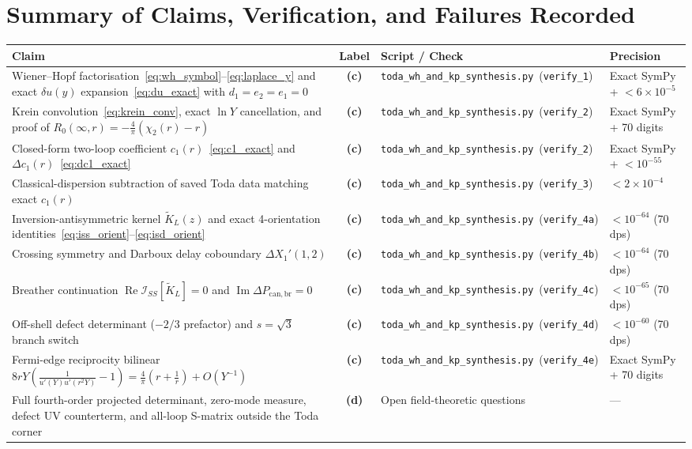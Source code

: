\documentclass[11pt,a4paper]{article}
\newcommand{\Lc}{\textsf{\textbf{(c)}}}
\newcommand{\Ld}{\textsf{\textbf{(d)}}}
\newcommand{\scrshort}{\texttt{toda\_\allowbreak wh\_\allowbreak and\_\allowbreak kp\_\allowbreak synthesis.py}}
\theoremstyle{remark}
\begin{document}
\section{Summary of Claims, Verification, and Failures Recorded}

\begin{longtable}{@{}L{6.5cm}cL{4.2cm}L{2.8cm}@{}}
\toprule
Claim & Label & Script / Check & Precision \\
\midrule
\endhead
Wiener--Hopf factorisation~\eqref{eq:wh_symbol}--\eqref{eq:laplace_y} and exact $\delta u(y)$ expansion~\eqref{eq:du_exact} with $d_1=e_2=e_1=0$ & \Lc & \scrshort\ (\texttt{verify\_1}) & Exact SymPy + $<6\times 10^{-5}$ \\
Krein convolution~\eqref{eq:krein_conv}, exact $\ln Y$ cancellation, and proof of $R_0(\infty,r) = -\frac{4}{\pi}(\chi_2(r)-r)$ & \Lc & \scrshort\ (\texttt{verify\_2}) & Exact SymPy + 70 digits \\
Closed-form two-loop coefficient $c_1(r)$~\eqref{eq:c1_exact} and $\Delta c_1(r)$~\eqref{eq:dc1_exact} & \Lc & \scrshort\ (\texttt{verify\_2}) & Exact SymPy + $<10^{-55}$ \\
Classical-dispersion subtraction of saved Toda data matching exact $c_1(r)$ & \Lc & \scrshort\ (\texttt{verify\_3}) & $<2\times 10^{-4}$ \\
Inversion-antisymmetric kernel $\widetilde{K}_L(z)$ and exact 4-orientation identities~\eqref{eq:iss_orient}--\eqref{eq:isd_orient} & \Lc & \scrshort\ (\texttt{verify\_4a}) & $<10^{-64}$ (70 dps) \\
Crossing symmetry and Darboux delay coboundary $\Delta X_1'(1,2)$ & \Lc & \scrshort\ (\texttt{verify\_4b}) & $<10^{-64}$ (70 dps) \\
Breather continuation $\operatorname{Re}\mathcal{I}_{SS}[\widetilde{K}_L]=0$ and $\operatorname{Im}\Delta P_{\mathrm{can,br}}=0$ & \Lc & \scrshort\ (\texttt{verify\_4c}) & $<10^{-65}$ (70 dps) \\
Off-shell defect determinant ($-2/3$ prefactor) and $s=\sqrt{3}$ branch switch & \Lc & \scrshort\ (\texttt{verify\_4d}) & $<10^{-60}$ (70 dps) \\
Fermi-edge reciprocity bilinear $8rY(\frac{1}{u'(Y)u'(r^2 Y)}-1) = \frac{4}{\pi}(r+\frac{1}{r})+O(Y^{-1})$ & \Lc & \scrshort\ (\texttt{verify\_4e}) & Exact SymPy + 70 digits \\
Full fourth-order projected determinant, zero-mode measure, defect UV counterterm, and all-loop S-matrix outside the Toda corner & \Ld & Open field-theoretic questions & --- \\
\bottomrule
\end{longtable}
\end{document}
